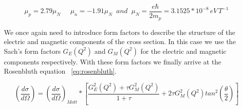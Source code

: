  \begin{equation} \label{eq:mag_mom}
\mu_p = 2.79 \mu_N \;\;\;\;\; \mu_n = -1.91 \mu_N \;\; and \;\; \mu_N = \frac{e\hbar}{2m_p} = 3.1525 * 10^{-8} \, eV \, T^{-1}
\end{equation}

\noindent We once again need to introduce form factors to describe the structure of the electric and magnetic components of the cross section. In this case we use the Sach's form factors $G_E(Q^2)$ and $G_M(Q^2)$ for the electric and magnetic components respectively. With these form factors we finally arrive at the Rosenbluth equation ~\ref{eq:rosenbluth}.

\begin{equation} \label{eq:rosenbluth}
\left(\frac{d\sigma}{d\Omega}\right) = \left( \frac{d\sigma}{d\Omega} \right)_{Mott} * \left[ \frac{G_E^2(Q^2)+\tau G_M^2(Q^2)}{1+\tau} + 2 \tau G_M^2(Q^2) tan^2\left( \frac{\theta}{2} \right) \right]
\end{equation}
